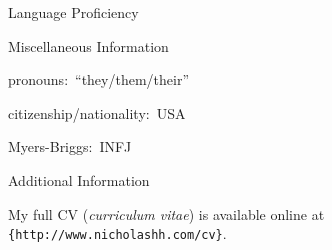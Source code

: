\documentclass{resume}
\begin{document}
{\begin{rSection}{Language Proficiency}
  \end{rSection}





  \begin{rSection}{Miscellaneous Information}

  pronouns:~``they/them/their''

  citizenship/nationality:~USA

  Myers-Briggs:~INFJ

  \end{rSection}





}{

  \begin{rSection}{Additional Information}


    My full CV (\emph{curriculum vitae}) is available online at \texttt{\{http://www.nicholashh.com/cv\}}.

  \end{rSection}

}
\end{document}

